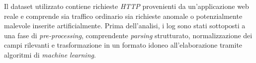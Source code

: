 Il dataset utilizzato contiene richieste \emph{HTTP} provenienti da un’applicazione web reale e comprende sia traffico ordinario sia richieste anomale o potenzialmente malevole inserite artificialmente. Prima dell’analisi, i log sono stati sottoposti a una fase di \emph{pre-processing}, comprendente \emph{parsing} strutturato, normalizzazione dei campi rilevanti e trasformazione in un formato idoneo all’elaborazione tramite algoritmi di \emph{machine learning}.